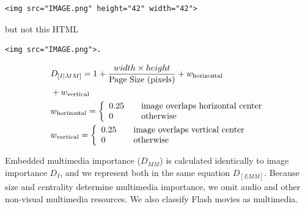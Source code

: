 \begin{verbatim}
<img src="IMAGE.png" height="42" width="42">
\end{verbatim}

\noindent but not this HTML

\begin{verbatim}
<img src="IMAGE.png">.
\end{verbatim}



\begin{equation}
\label{imagedamage}
\begin{split}
&D_{[I|MM]} = 1 + \frac{width \times height}{\text{Page Size (pixels)}} + w_{\text{horizontal}} \\&+ w_{\text{vertical}}\\
&w_{\text{horizontal}} =  \left\{
  \begin{array}{l l}
    0.25 & \quad \text{image overlaps horizontal center}\\
    0    & \quad \text{otherwise}
  \end{array} \right.\\
&w_{\text{vertical}} =  \left\{
  \begin{array}{l l}
    0.25 & \quad \text{image overlaps vertical center}\\
    0    & \quad \text{otherwise}
  \end{array} \right.
\end{split}
\end{equation}


Embedded multimedia importance ($D_{MM}$) is calculated identically to image importance $D_I$, and we represent both in the same equation $D_{[I|MM]}$. Because size and centrality determine multimedia importance, we omit audio and other non-visual multimedia resources. We also classify Flash movies as multimedia.


